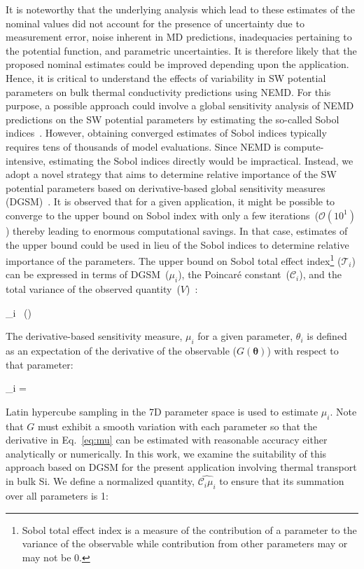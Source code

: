 It is noteworthy that the underlying analysis which lead to these estimates of the nominal values did not
account for the presence of uncertainty due to
measurement error, noise inherent in MD predictions, inadequacies pertaining to the potential function,
and parametric uncertainties. It is therefore likely that the proposed nominal estimates could be 
improved depending upon the application. Hence, it is critical to understand the effects of variability in
SW potential parameters on bulk thermal conductivity predictions using NEMD. For this purpose, a possible
approach could involve a global sensitivity analysis of NEMD predictions on the SW potential parameters 
by estimating the so-called Sobol indices~\cite{Sobol:2001}. However, obtaining converged estimates of
Sobol indices typically requires tens of thousands of model evaluations. Since NEMD is compute-intensive,
estimating the Sobol indices directly would be impractical. Instead, we adopt a novel strategy that
aims to determine relative importance of the SW potential parameters based on derivative-based global 
sensitivity measures (DGSM)~\cite{Sobol:2010}. It is observed that for a given application, it might be possible to 
converge to the upper bound on
Sobol index with only a few iterations~($\mathcal{O}(10^{1})$) thereby leading to enormous computational savings. 
In that case, estimates of the upper bound could be used in lieu of the
Sobol indices to determine relative importance of the parameters. The upper bound on 
Sobol total effect index\footnote{Sobol total effect index is a measure of the contribution of a 
parameter to the variance of the observable while contribution from other parameters may or may not be 0.}
($\mathcal{T}_i$) can be expressed in terms of DGSM~($\mu_i$), the Poincar\' e 
constant~($\mathcal{C}_i$), and the total variance of the observed
quantity~($V$)~\cite{Lamboni:2013,Roustant:2014}:   

\be
{}_i \leq {}~(\propto {}) 
\ee 

\noindent The derivative-based sensitivity measure, $\mu_i$ for a given parameter, $\theta_i$ is defined as an expectation
of the derivative of the observable ($G(\bm{\theta})$) with respect to that parameter:

\be
\mu_i = 
\label{eq:mu}
\ee

\noindent Latin hypercube sampling in the 7D parameter space is used to estimate $\mu_i$. Note that $G$ must 
exhibit a smooth variation with each parameter so that the derivative in Eq.~\ref{eq:mu} can be estimated
with reasonable accuracy either analytically or numerically. 
 In this work, we examine the suitability of this
approach based on DGSM for the present application involving thermal transport in bulk Si. We define a 
normalized quantity, $\hat{\mathcal{C}_i\mu_i}$ to ensure that its summation over all parameters is 1:

